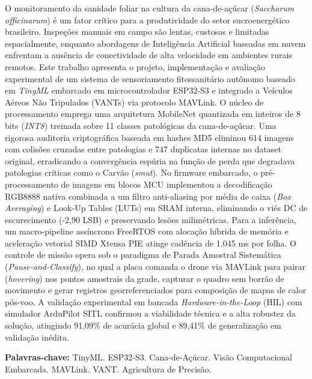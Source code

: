\documentclass[
    12pt,
    openright,
    oneside,
    a4paper,
    chapter=TITLE,
    section=TITLE,
    english,
    brazil
]{abntex2}
\begin{document}
\frenchspacing

\imprimircapa
\imprimirfolhaderosto

\begin{resumo}
O monitoramento da sanidade foliar na cultura da cana-de-açúcar (\textit{Saccharum officinarum}) é um fator crítico para a produtividade do setor sucroenergético brasileiro. Inspeções manuais em campo são lentas, custosas e limitadas espacialmente, enquanto abordagens de Inteligência Artificial baseadas em nuvem enfrentam a ausência de conectividade de alta velocidade em ambientes rurais remotos. Este trabalho apresenta o projeto, implementação e avaliação experimental de um sistema de sensoriamento fitossanitário autônomo baseado em \textit{TinyML} embarcado em microcontrolador ESP32-S3 e integrado a Veículos Aéreos Não Tripulados (VANTs) via protocolo MAVLink. O núcleo de processamento emprega uma arquitetura MobileNet quantizada em inteiros de 8 bits (\textit{INT8}) treinada sobre 11 classes patológicas da cana-de-açúcar. Uma rigorosa auditoria criptográfica baseada em hashes MD5 eliminou 614 imagens com colisões cruzadas entre patologias e 747 duplicatas internas no dataset original, erradicando a convergência espúria na função de perda que degradava patologias críticas como o Carvão (\textit{smut}). No firmware embarcado, o pré-processamento de imagens em blocos MCU implementou a decodificação RGB8888 nativa combinada a um filtro anti-aliasing por média de caixa (\textit{Box Averaging}) e Look-Up Tables (LUTs) em SRAM interna, eliminando o viés DC de escurecimento (-2,90 LSB) e preservando lesões milimétricas. Para a inferência, um macro-pipeline assíncrono FreeRTOS com alocação híbrida de memória e aceleração vetorial SIMD Xtensa PIE atinge cadência de 1.045 ms por folha. O controle de missão opera sob o paradigma de Parada Amostral Sistemática (\textit{Pause-and-Classify}), no qual a placa comanda o drone via MAVLink para pairar (\textit{hovering}) nos pontos amostrais da grade, capturar o quadro sem borrão de movimento e gerar registros georreferenciados para composição de mapas de calor pós-voo. A validação experimental em bancada \textit{Hardware-in-the-Loop} (HIL) com simulador ArduPilot SITL confirmou a viabilidade técnica e a alta robustez da solução, atingindo 91,09\% de acurácia global e 89,41\% de generalização em validação inédita.

\textbf{Palavras-chave:} TinyML. ESP32-S3. Cana-de-Açúcar. Visão Computacional Embarcada. MAVLink. VANT. Agricultura de Precisão.
\end{resumo}
\end{document}
